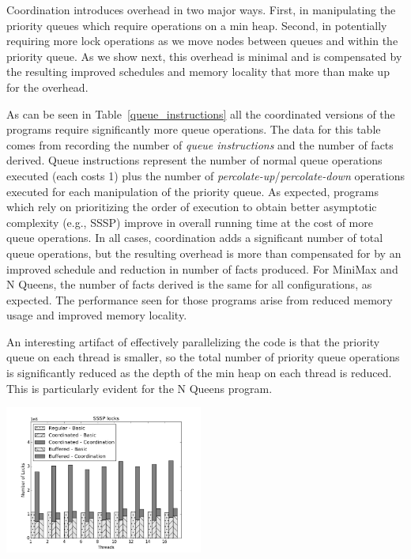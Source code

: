 Coordination introduces overhead in two major ways.  First, in
manipulating the priority queues which require operations on a min
heap.  Second, in potentially requiring more lock operations as we
move nodes between queues and within the priority queue.  As we show
next, this overhead is minimal and is compensated by the resulting improved schedules
and memory locality that more than make up for the overhead.

As can be seen in Table~\ref{queue_instructions} all the coordinated
versions of the programs require significantly more queue operations.
The data for this table comes from recording the number of \emph{queue instructions} and the number of facts derived.
Queue instructions represent the
number of normal queue operations executed (each costs 1) plus the
number of \emph{percolate-up}/\emph{percolate-down} operations
executed for each manipulation of the priority queue.  As expected,
programs which rely on prioritizing the order of execution to obtain
better asymptotic complexity (e.g., SSSP) improve in overall running
time at the cost of more queue operations.  In all cases, coordination
adds a significant number of total queue operations, but the resulting
overhead is more than compensated for by an improved schedule and reduction
in number of facts produced. For MiniMax and N Queens, the number of facts derived
is the same for all configurations, as expected. The performance seen for those programs
arise from reduced memory usage and improved memory locality.

An interesting artifact of effectively parallelizing the code is that
the priority queue on each thread is smaller, so the total number of
priority queue operations is significantly reduced as the depth of the
min heap on each thread is reduced.  This is particularly evident for
the N Queens program.

\begin{topfig}
   \begin{center}
      \includegraphics[width=6.5cm]{results/locks/sssp-locks.png}
   \end{center}
\end{topfig}


